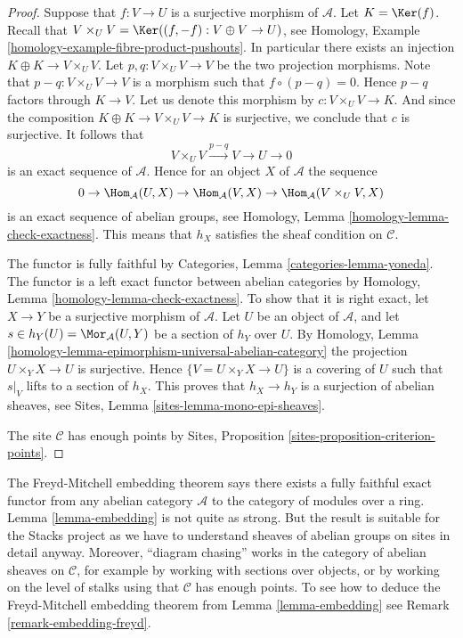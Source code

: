 \begin{proof}
Suppose that $f : V \to U$ is a surjective morphism of $\mathcal{A}$.
Let $K = \Ker(f)$. Recall that
$V \times_U V = \Ker((f, -f) : V \oplus V \to U)$, see
Homology, Example \ref{homology-example-fibre-product-pushouts}.
In particular there exists an injection $K \oplus K \to V \times_U V$.
Let $p, q : V \times_U V \to V$ be the two projection morphisms.
Note that $p - q : V \times_U V \to V$ is a morphism such that
$f \circ (p  - q) = 0$. Hence $p - q$ factors through $K \to V$.
Let us denote this morphism by $c : V \times_U V \to K$.
And since the composition $K \oplus K \to V \times_U V \to K$
is surjective, we conclude that $c$ is surjective. It follows that
$$
V \times_U V \xrightarrow{p - q} V \to U \to 0
$$
is an exact sequence of $\mathcal{A}$.
Hence for an object $X$ of $\mathcal{A}$ the sequence
$$
0 \to
\Hom_\mathcal{A}(U, X) \to
\Hom_\mathcal{A}(V, X) \to
\Hom_\mathcal{A}(V \times_U V, X)
$$
is an exact sequence of abelian groups, see
Homology, Lemma \ref{homology-lemma-check-exactness}.
This means that $h_X$ satisfies the sheaf condition
on $\mathcal{C}$.

\medskip\noindent
The functor is fully faithful by
Categories, Lemma \ref{categories-lemma-yoneda}.
The functor is a left exact functor between abelian categories by
Homology, Lemma \ref{homology-lemma-check-exactness}.
To show that it is right exact, let $X \to Y$ be a surjective morphism
of $\mathcal{A}$. Let $U$ be an object of $\mathcal{A}$, and let
$s \in h_Y(U) = \Mor_\mathcal{A}(U, Y)$ be a section of $h_Y$
over $U$. By
Homology, Lemma \ref{homology-lemma-epimorphism-universal-abelian-category}
the projection $U \times_Y X \to U$ is surjective.
Hence $\{V = U \times_Y X \to U\}$ is a covering of $U$ such that
$s|_V$ lifts to a section of $h_X$. This proves that
$h_X \to h_Y$ is a surjection of abelian sheaves, see
Sites, Lemma \ref{sites-lemma-mono-epi-sheaves}.

\medskip\noindent
The site $\mathcal{C}$ has enough points by
Sites, Proposition \ref{sites-proposition-criterion-points}.
\end{proof}

\begin{remark}
\label{remark-embedding}
The Freyd-Mitchell embedding theorem says there exists a fully faithful
exact functor from any abelian category $\mathcal{A}$
to the category of modules over a ring.
Lemma \ref{lemma-embedding}
is not quite as strong. But the result is suitable for the
Stacks project as we have to understand sheaves of abelian groups on
sites in detail anyway. Moreover, ``diagram chasing'' works in the category
of abelian sheaves on $\mathcal{C}$, for example by working with sections over
objects, or by working on the level of stalks using that $\mathcal{C}$ has
enough points. To see how to deduce the Freyd-Mitchell embedding theorem from
Lemma \ref{lemma-embedding}
see
Remark \ref{remark-embedding-freyd}.
\end{remark}

